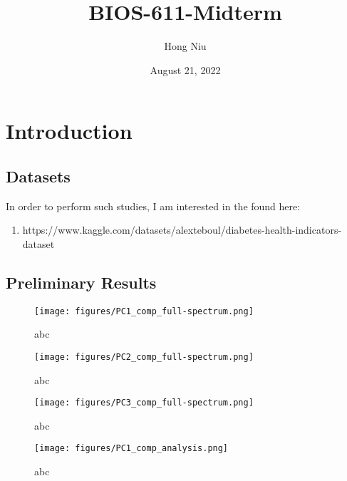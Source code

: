 \documentclass{article}
\title{BIOS-611-Midterm}
\author{Hong Niu}
\date{August 21, 2022}
\begin{document}
\maketitle

\section{Introduction}
   

\subsection{Datasets} 

In order to perform such studies, I am interested in the found here: 
\begin{enumerate}
    \item https://www.kaggle.com/datasets/alexteboul/diabetes-health-indicators-dataset
\end{enumerate}
 
\subsection{Preliminary Results} 

	\begin{figure}[ht]
		\begin{center} 
		\centering
			\texttt{[image: figures/PC1\_comp\_full-spectrum.png]}
			\caption{abc}
			\end{center}
		\end{figure}

	\begin{figure}[ht]
		\begin{center} 
		\centering
			\texttt{[image: figures/PC2\_comp\_full-spectrum.png]}
			\caption{abc}
			\end{center}
		\end{figure}	

	\begin{figure}[ht]
		\begin{center} 
		\centering
			\texttt{[image: figures/PC3\_comp\_full-spectrum.png]}
			\caption{abc}
			\end{center}
		\end{figure}

	\begin{figure}[ht]
		\begin{center} 
		\centering
			\texttt{[image: figures/PC1\_comp\_analysis.png]}
			\caption{abc}
			\end{center}
		\end{figure}
\end{document}
